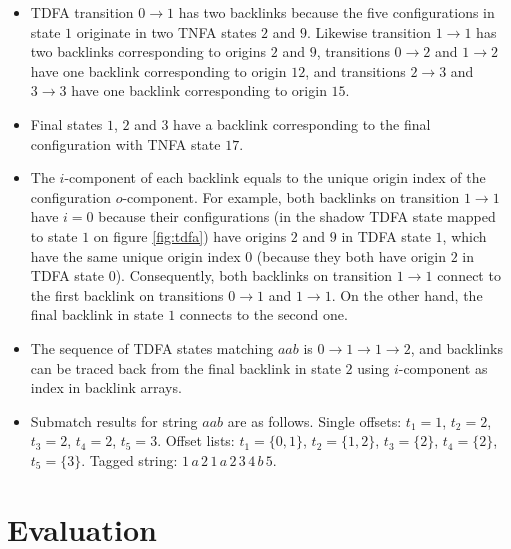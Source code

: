 \documentclass[]{article}
\begin{document}
\begin{itemize}

\item[\ding{212}]
TDFA transition $0 \!\rightarrow\! 1$ has two backlinks
because the five configurations in state $1$ originate in two TNFA states $2$ and $9$.
Likewise transition $1 \!\rightarrow\! 1$ has two backlinks corresponding to origins $2$ and $9$,
transitions $0 \!\rightarrow\! 2$ and $1 \!\rightarrow\! 2$ have one backlink corresponding to origin $12$,
and transitions $2 \!\rightarrow\! 3$ and $3 \!\rightarrow\! 3$ have one backlink corresponding to origin $15$.
\medskip

\item[\ding{212}]
Final states $1$, $2$ and $3$ have a backlink corresponding to the final configuration with TNFA state $17$.
\medskip

\item[\ding{212}]
The $i$-component of each backlink equals to the unique origin index of the configuration $o$-component.
For example, both backlinks on transition $1 \!\rightarrow\! 1$ have $i=0$ because
their configurations (in the shadow TDFA state mapped to state $1$ on figure \ref{fig:tdfa}) have origins $2$ and $9$ in TDFA state $1$,
which have the same unique origin index $0$ (because they both have origin $2$ in TDFA state $0$).
Consequently, both backlinks on transition $1 \!\rightarrow\! 1$ connect to the first backlink on transitions $0 \!\rightarrow\! 1$ and $1 \!\rightarrow\! 1$.
On the other hand, the final backlink in state $1$ connects to the second one.
\medskip

\item[\ding{212}]
The sequence of TDFA states matching $aab$ is $0 \!\rightarrow\! 1 \!\rightarrow\! 1 \!\rightarrow\! 2$,
and backlinks can be traced back from the final backlink in state $2$
using $i$-component as index in backlink arrays.
\medskip

\item[\ding{212}]
Submatch results for string $aab$ are as follows.
Single offsets: $t_1\!=\!1$, $t_2\!=\!2$, $t_3\!=\!2$, $t_4\!=\!2$, $t_5\!=\!3$.
Offset lists: $t_1\!=\!\{0,1\}$, $t_2\!=\!\{1,2\}$, $t_3\!=\!\{2\}$, $t_4\!=\!\{2\}$, $t_5\!=\!\{3\}$.
Tagged string: $1\,a\,2\,1\,a\,2\,3\,4\,b\,5$.
\medskip

\end{itemize}

\FloatBarrier

\section{Evaluation}\label{section_evaluation}
\end{document}
